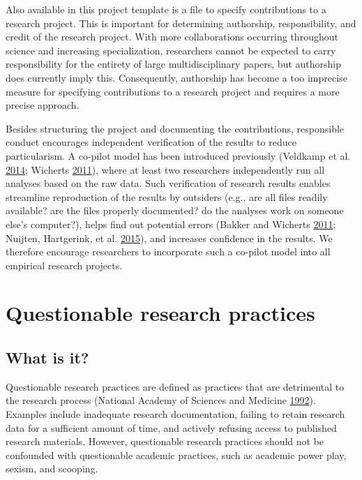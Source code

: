 \documentclass[a5paper]{book}
\begin{document}
Also available in this project template is a file to specify
contributions to a research project. This is important for determining
authorship, responsibility, and credit of the research project. With
more collaborations occurring throughout science and increasing
specialization, researchers cannot be expected to carry responsibility
for the entirety of large multidisciplinary papers, but authorship does
currently imply this. Consequently, authorship has become a too
imprecise measure for specifying contributions to a research project and
requires a more precise approach.

Besides structuring the project and documenting the contributions,
responsible conduct encourages independent verification of the results
to reduce particularism. A co-pilot model has been introduced previously
(Veldkamp et al.
\protect\hyperlink{ref-doi:10.1371ux2fjournal.pone.0114876}{2014};
Wicherts \protect\hyperlink{ref-doi:10.1038ux2f480007a}{2011}), where at
least two researchers independently run all analyses based on the raw
data. Such verification of research results enables streamline
reproduction of the results by outsiders (e.g., are all files readily
available? are the files properly documented? do the analyses work on
someone else's computer?), helps find out potential errors (Bakker and
Wicherts \protect\hyperlink{ref-doi:10.3758ux2fs13428-011-0089-5}{2011};
Nuijten, Hartgerink, et al.
\protect\hyperlink{ref-doi:10.3758ux2fs13428-015-0664-2}{2015}), and
increases confidence in the results. We therefore encourage researchers
to incorporate such a co-pilot model into all empirical research
projects.

\hypertarget{questionable-research-practices}{\section{Questionable
research practices}\label{questionable-research-practices}}

\subsection{What is it?}\label{what-is-it-1}

Questionable research practices are defined as practices that are
detrimental to the research process (National Academy of Sciences and
Medicine \protect\hyperlink{ref-doi:10.17226ux2f1864}{1992}). Examples
include inadequate research documentation, failing to retain research
data for a sufficient amount of time, and actively refusing access to
published research materials. However, questionable research practices
should not be confounded with questionable academic practices, such as
academic power play, sexism, and scooping.
\end{document}
